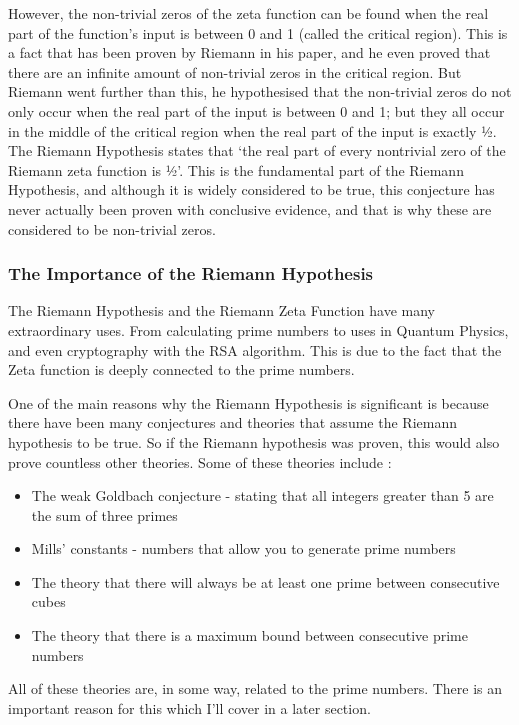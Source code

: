 \documentclass{article}
\begin{document}
However, the non-trivial zeros of the zeta function can be found when the real part of the function’s input is between 0 and 1 (called the critical region). This is a fact that has been proven by Riemann in his paper, and he even proved that there are an infinite amount of non-trivial zeros in the critical region. But Riemann went further than this, he hypothesised that the non-trivial zeros do not only occur when the real part of the input is between 0 and 1; but they all occur in the middle of the critical region when the real part of the input is exactly ½. The Riemann Hypothesis states that ‘the real part of every nontrivial zero of the Riemann zeta function is ½’. This is the fundamental part of the Riemann Hypothesis, and although it is widely considered to be true, this conjecture has never actually been proven with conclusive evidence, and that is why these are considered to be non-trivial zeros.


\subsubsection{The Importance of the Riemann Hypothesis}
The Riemann Hypothesis and the  Riemann Zeta Function have many extraordinary uses. From calculating prime numbers to uses in Quantum Physics, and even cryptography with the RSA algorithm. This is due to the fact that the Zeta function is deeply connected to the prime numbers.

One of the main reasons why the Riemann Hypothesis is significant is because there have been many conjectures and theories that assume the Riemann hypothesis to be true. So if the Riemann hypothesis was proven, this would also prove countless other theories.
Some of these theories include :
\begin{itemize}
    \item The weak Goldbach conjecture - stating that all integers greater than 5 are the sum of three primes
    \item Mills’ constants - numbers that allow you to generate prime numbers
    \item The theory that there will always be at least one prime between consecutive cubes
    \item The theory that there is a maximum bound between consecutive prime numbers
\end{itemize}
All of these theories are, in some way, related to the prime numbers. There is an important reason for this which I’ll cover in a later section.
\end{document}
